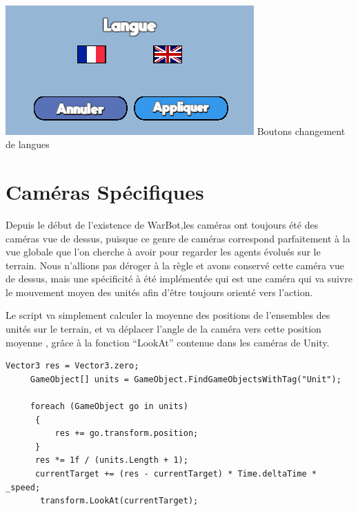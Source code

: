 \documentclass{report}
\begin{document}
\paragraph{}
\begin{center}
\includegraphics[scale=0.8]{DATA/langue.png}
 {Boutons changement de langues}
\end{center}
\paragraph{}
\newpage


\section{Caméras Spécifiques}
Depuis le début de l’existence de WarBot,les caméras ont toujours été des caméras vue de dessus, puisque ce genre de caméras correspond parfaitement à la vue globale que l’on cherche à avoir pour regarder les agents évolués sur le terrain.
Nous n’allions pas déroger à la règle et avons conservé cette caméra vue de dessus, mais une spécificité à été implémentée qui est une caméra qui va suivre le mouvement moyen des unités afin d'être toujours orienté vers l’action. 

Le script va simplement calculer la moyenne des positions de l’ensembles des unités sur le terrain, et va déplacer l’angle de la caméra vers cette position moyenne , grâce à la fonction “LookAt” contenue dans les caméras de Unity. 

\begin{lstlisting}[frame=single]
     Vector3 res = Vector3.zero;
     GameObject[] units = GameObject.FindGameObjectsWithTag("Unit");

     foreach (GameObject go in units)
      {
          res += go.transform.position;
      }
      res *= 1f / (units.Length + 1);
      currentTarget += (res - currentTarget) * Time.deltaTime * _speed;
       transform.LookAt(currentTarget);
\end{lstlisting}
\end{document}
